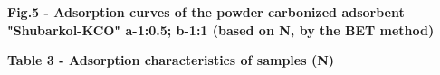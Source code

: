 {\bfseries Fig.5 - Adsorption curves of the powder carbonized adsorbent
"Shubarkol-KCO" a-1:0.5; b-1:1 (based
on N, by the BET method)}

{\bfseries Table 3 - Adsorption characteristics of samples
(N)}


